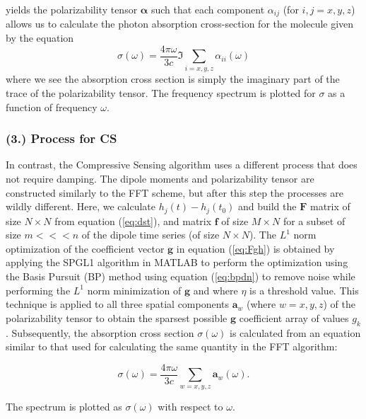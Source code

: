 \documentclass[11pt]{article}
\begin{document}
yields the polarizability tensor $\mathbf{\alpha}$ such that each component $\alpha_{ij}$ (for $i,j = x,y,z$) allows us to calculate the photon absorption cross-section for the molecule given by the equation
\begin{equation}\label{eq:fftcross}
	\sigma(\omega) = \frac{4 \pi \omega}{3c}  \Im\sum_{i = x, y, z} \alpha_{ii}(\omega)
\end{equation}
where we see the absorption cross section is simply the imaginary part of the trace of the polarizability tensor.  The frequency spectrum is plotted for $\sigma$ as a function of frequency $\omega$.

\subsubsection*{(3.)	Process for CS}	%

\par In contrast, the Compressive Sensing algorithm uses a different process that does not require damping.  The dipole moments and polarizability tensor are constructed similarly to the FFT scheme, but after this step the processes are wildly different. Here, we calculate $h_{j}(t) - h_{j}(t_{0})$ and build the $\mathbf{F}$ matrix of size $N \times N$ from equation (\ref{eq:dst}), and matrix $\mathbf{f}$ of size $M \times N$  for a subset of size $m <<< n$ of the dipole time series (of size $N \times N$).  The $L^{1}$ norm optimization of the coefficient vector $\mathbf{g}$ in equation (\ref{eq:Fgh}) is obtained by applying the SPGL1 algorithm in MATLAB to perform the optimization using the Basis Pursuit (BP) method using equation (\ref{eq:bpdn}) to remove noise while performing the $L^{1}$ norm minimization of $\mathbf{g}$ and where $\eta$ is a threshold value. This technique is applied to all three spatial components $\mathbf{a}_{w}$ (where $w = x,y,z$) of the polarizability tensor to obtain the sparsest possible $\mathbf{g}$ coefficient array of values $g_{k}$.  Subsequently, the absorption cross section $\sigma(\omega)$ is calculated from an equation similar to that used for calculating the same quantity in the FFT algorithm:

\begin{equation}\label{eq:cscross}
	\sigma(\omega) = \frac{4\pi\omega}{3c}\sum_{w = x,y,z}\mathbf{a}_{w}(\omega).
\end{equation}

The spectrum is plotted as $\sigma(\omega)$ with respect to $\omega$.
\end{document}
